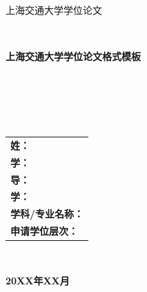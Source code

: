 \documentclass[UTF8,a4paper,12pt]{ctexart}
\numberwithin{equation}{section}
\begin{document}
\thispagestyle{empty}

\renewcommand{\headrulewidth}{0pt}
\begin{figure}[htb] 
 \end{figure}

\begin{center}
\songti {} 上海交通大学学位论文
\end{center}
~\\
\begin{center}
\songti {} \textbf{上海交通大学学位论文格式模板}
\end{center}
~\\
~\\
~\\
~\\
\begin{center}
\heiti {}
\begin{tabular}{l}
\textbf{姓：}\\
\textbf{学：}\\
\textbf{导：}\\
\textbf{学： }\\
\textbf{学科/专业名称：}\\
\textbf{申请学位层次：}\\
\end{tabular}
\end{center}
~\\
\begin{center}
\songti {} \textbf{20XX年XX月}
\end{center}
\end{document}
